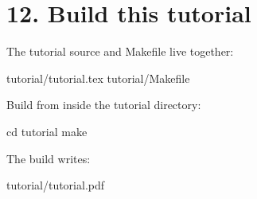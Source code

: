 \documentclass[11pt,a4paper]{article}
\begin{document}
\section*{12. Build this tutorial}

The tutorial source and Makefile live together:

\begin{outputbox}
tutorial/tutorial.tex
tutorial/Makefile
\end{outputbox}

Build from inside the tutorial directory:

\begin{commandbox}
cd tutorial
make
\end{commandbox}

The build writes:

\begin{outputbox}
tutorial/tutorial.pdf
\end{outputbox}
\end{document}
